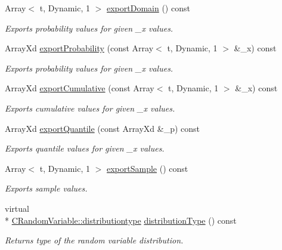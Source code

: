 \begin{DoxyCompactItemize}
Array$<$ t, Dynamic, 1 $>$ \hyperlink{class_go_s_u_m_1_1_t_model_variable_a63396005c1bbf85a9afeaacc39e5511b}{export\-Domain} () const 
\begin{DoxyCompactList}\small\item\em Exports probability values for given \-\_\-x values. \end{DoxyCompactList}\item 
Array\-Xd \hyperlink{class_go_s_u_m_1_1_t_model_variable_a5258b734fe5e9d101974afb4340962d0}{export\-Probability} (const Array$<$ t, Dynamic, 1 $>$ \&\-\_\-x) const 
\begin{DoxyCompactList}\small\item\em Exports probability values for given \-\_\-x values. \end{DoxyCompactList}\item 
Array\-Xd \hyperlink{class_go_s_u_m_1_1_t_model_variable_ae77b154e6c1dab7ab45850ae8352bdf8}{export\-Cumulative} (const Array$<$ t, Dynamic, 1 $>$ \&\-\_\-x) const 
\begin{DoxyCompactList}\small\item\em Exports cumulative values for given \-\_\-x values. \end{DoxyCompactList}\item 
Array\-Xd \hyperlink{class_go_s_u_m_1_1_t_model_variable_a21dca63fa52a498c7a1cf9aedc0c001f}{export\-Quantile} (const Array\-Xd \&\-\_\-p) const 
\begin{DoxyCompactList}\small\item\em Exports quantile values for given \-\_\-x values. \end{DoxyCompactList}\item 
Array$<$ t, Dynamic, 1 $>$ \hyperlink{class_go_s_u_m_1_1_t_model_variable_a8bbe390a7629c543412135ca40217be7}{export\-Sample} () const 
\begin{DoxyCompactList}\small\item\em Exports sample values. \end{DoxyCompactList}\item 
virtual \\*
\hyperlink{class_c_random_variable_a80d2a87c43847274138b51f7d713d7f1}{C\-Random\-Variable\-::distributiontype} \hyperlink{class_go_s_u_m_1_1_t_model_variable_a8dea19600fc9455dadd31a79c539e82e}{distribution\-Type} () const 
\begin{DoxyCompactList}\small\item\em Returns type of the random variable distribution. \end{DoxyCompactList}\item 

\end{DoxyCompactItemize}
